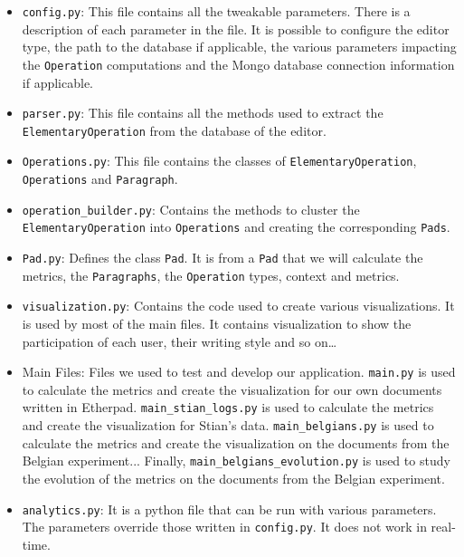 \documentclass[a4, twocolumn, 12pt]{article}
\begin{document}
\begin{itemize}
    \item \texttt{config.py}: This file contains all the tweakable parameters. There is a description of each parameter in the file. It is possible to configure the editor type, the path to the database if applicable, the various parameters impacting the \texttt{Operation} computations and the Mongo database connection information if applicable.
    
    \item \texttt{parser.py}: This file contains all the methods used to extract the \texttt{ElementaryOperation} from the database of the editor.
    
    \item \texttt{Operations.py}: This file contains the classes of \texttt{ElementaryOperation}, \texttt{Operations} and \texttt{Paragraph}.
    
    \item \texttt{operation\_builder.py}: Contains the methods to cluster the \texttt{ElementaryOperation} into \texttt{Operations} and creating the corresponding \texttt{Pads}.
    
    \item \texttt{Pad.py}: Defines the class \texttt{Pad}. It is from a \texttt{Pad} that we will calculate the metrics, the \texttt{Paragraphs}, the \texttt{Operation} types, context and metrics.
    
    \item \texttt{visualization.py}: Contains the code used to create various visualizations. It is used by most of the main files. It contains visualization to show the participation of each user, their writing style and so on…
    
    \item Main Files: Files we used to test and develop our application. \texttt{main.py} is used to calculate the metrics and create the visualization for our own documents written in Etherpad. \texttt{main\_stian\_logs.py} is used to calculate the metrics and create the visualization for Stian's data. \texttt{main\_belgians.py} is used to calculate the metrics and create the visualization on the documents from the Belgian experiment... Finally, \texttt{main\_belgians\_evolution.py} is used to study the evolution of the metrics on the documents from the Belgian experiment.
    
    \item \texttt{analytics.py}: It is a python file that can be run with various parameters. The parameters override those written in \texttt{config.py}. It does not work in real-time.
    

\end{itemize}
\end{document}

